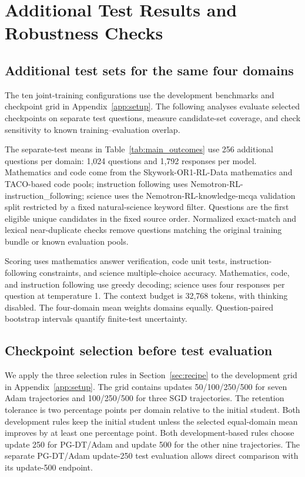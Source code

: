 \section{Additional Test Results and Robustness Checks}
\label{app:completed_results}

\subsection{Additional test sets for the same four domains}
\label{app:independent_domain_test}

The ten joint-training configurations use the development benchmarks and checkpoint grid in Appendix~\ref{app:setup}. The following analyses evaluate selected checkpoints on separate test questions, measure candidate-set coverage, and check sensitivity to known training--evaluation overlap.

The separate-test means in Table~\ref{tab:main_outcomes} use 256 additional questions per domain: 1,024 questions and 1,792 responses per model. Mathematics and code come from the Skywork-OR1-RL-Data mathematics and TACO-based code pools; instruction following uses Nemotron-RL-instruction\_following; science uses the Nemotron-RL-knowledge-mcqa validation split restricted by a fixed natural-science keyword filter. Questions are the first eligible unique candidates in the fixed source order. Normalized exact-match and lexical near-duplicate checks remove questions matching the original training bundle or known evaluation pools.

Scoring uses mathematics answer verification, code unit tests, instruction-following constraints, and science multiple-choice accuracy. Mathematics, code, and instruction following use greedy decoding; science uses four responses per question at temperature 1. The context budget is 32,768 tokens, with thinking disabled. The four-domain mean weights domains equally. Question-paired bootstrap intervals quantify finite-test uncertainty.

\subsection{Checkpoint selection before test evaluation}
\label{app:completed_selection}

We apply the three selection rules in Section~\ref{sec:recipe} to the development grid in Appendix~\ref{app:setup}. The grid contains updates 50/100/250/500 for seven Adam trajectories and 100/250/500 for three SGD trajectories. The retention tolerance is two percentage points per domain relative to the initial student. Both development rules keep the initial student unless the selected equal-domain mean improves by at least one percentage point. Both development-based rules choose update 250 for PG-DT/Adam and update 500 for the other nine trajectories. The separate PG-DT/Adam update-250 test evaluation allows direct comparison with its update-500 endpoint.

